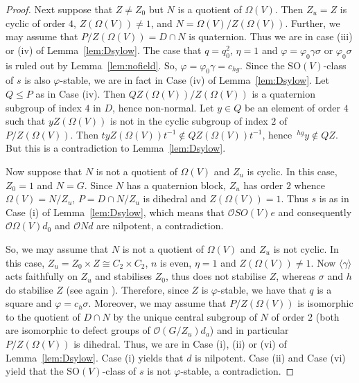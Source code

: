 \documentclass{amsart}
\theoremstyle{plain}\newtheorem{Theorem}{Theorem}[section]
\theoremstyle{plain}\newtheorem{Conjecture}[Theorem]{Conjecture}
\theoremstyle{plain}\newtheorem{Corollary}[Theorem]{Corollary}
\theoremstyle{plain}\newtheorem{Lemma}[Theorem]{Lemma}
\theoremstyle{plain}\newtheorem{Proposition}[Theorem]{Proposition}
\theoremstyle{definition}\newtheorem{Definition}[Theorem]{Definition}
\theoremstyle{definition}\newtheorem{Example}[Theorem]{Example}
\theoremstyle{definition}\newtheorem{Examples}[Theorem]{Examples}
\theoremstyle{definition}\newtheorem{Exercise}[Theorem]{Exercise}
\theoremstyle{definition}\newtheorem{Notation}[Theorem]{Notation}
\theoremstyle{definition}\newtheorem{Remark}[Theorem]{Remark}
\theoremstyle{definition}\newtheorem{Remarks}[Theorem]{Remarks}
\def\CO{{\mathcal{O}}}    \def\OPE{{\mathcal{O}(P\rtimes E)}}
\def\SO{\mathrm{SO}}
\numberwithin{equation}{section}
\begin{document}
\begin{proof}
 
Next suppose that  $Z \ne Z_0 $ but    $N$ is  a   quotient  of $\Omega(V)$.  Then  $Z_u =Z$ is  cyclic  of order $4$, $Z(\Omega(V)) \ne 1 $, and  $N =  \Omega (V)/Z (\Omega (V) ) $. Further,  we may assume  that  $ P/Z (\Omega (V) )= D\cap N  $  is quaternion.
Thus   we are in case  (iii) or  (iv) of Lemma~\ref{lem:Dsylow}.  The case that  
 $q =q_0^2 $,  $\eta  =1 $ and $\varphi=   \varphi_0 \gamma  \sigma $ or $ \varphi_0 \sigma $  is ruled out  by Lemma~\ref{lem:nofield}.   So,  $\varphi=   \varphi_0 \gamma = c_{hg} $.   Since  the  $\SO(V)$-class of $s$ is  also $\varphi$-stable, we  are in fact in  Case  (iv) of 
Lemma~\ref{lem:Dsylow}. Let  $Q \leq  P$  as in Case (iv).  Then  $QZ(\Omega(V)) / Z(\Omega(V))   $  is  a quaternion subgroup of  index  $4$  in  $D$, hence non-normal.  Let  $y \in Q$  be an element of order $4$  such that $y Z(\Omega (V))  $  is not in the cyclic  subgroup of index $2$ of $P/ Z(\Omega (V))  $. Then  $tyZ(\Omega (V)) t^{-1} \notin QZ(\Omega (V)) t^{-1}$, hence  $\, ^{hg} y \notin  QZ$. But this is a  contradiction   to Lemma~\ref{lem:Dsylow}.

Now suppose  that   $N$ is not a  quotient of  $\Omega (V)  $  and   $Z_u$ is  cyclic.  In this   case,   $Z_0= 1  $ and $N =G$.  
Since $N$ has  a quaternion block,   $Z_u$  has order $2$  whence $ \Omega(V)   =  N/  Z_u $,  $P =  D \cap N/Z_u $  is   dihedral  and $Z(\Omega(V) )=1 $.  Thus  $s$ is as in Case (i)  of Lemma~\ref{lem:Dsylow},  which means  that $\CO SO(V) e$   and consequently   $\CO  \Omega (V) d_0$ and   $\CO N d$   are nilpotent,  a contradiction.

So, we  may assume  that  $N$ is not a  quotient of  $\Omega (V)  $  and   $Z_u$ is  not  cyclic. In this case, $Z_u = Z_0 \times Z  \cong C_2 \times C_2 $,   $n $ is even, $\eta =1 $  and  $Z(\Omega (V)) \ne 1 $. Now $\langle \gamma \rangle$ acts  faithfully on $Z_u$  and  stabilises  $Z_0$, thus  does not stabilise $Z$, whereas   $\sigma $ and $h$  do stabilise  $Z$ (see again \cite[Thms.~2.5.12,~2.5.14]{GLS3}).  Therefore,  since  $Z$ is $\varphi$-stable,  we have that  $q$  is a square and   $\varphi= c_h \sigma  $. 
Moreover, we may  assume that $P/Z(\Omega(V))   $     is isomorphic  to   the quotient of   $ D \cap N   $ by the  unique central subgroup of $N$ of  order $2$   (both are isomorphic to defect  groups of $\CO (G/Z_u) d_a$)  and in particular  $P/Z(\Omega(V))   $   is   dihedral.     Thus, we are in Case (i), (ii) or (vi) of Lemma~\ref{lem:Dsylow}.   Case (i) yields  that $d$ is nilpotent.   Case (ii) and Case (vi)  yield that  the $\SO(V)$-class of  $s$ is not $\varphi$-stable,  a contradiction.
\end{proof} 
\end{document}
